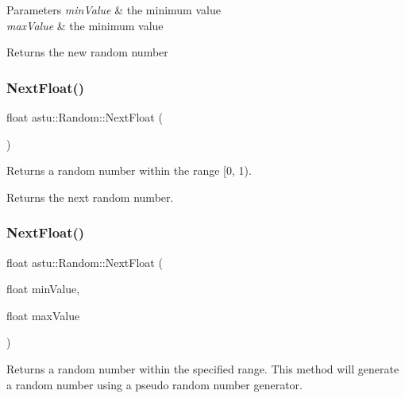 \begin{DoxyParams}{Parameters}
{\em min\+Value} & the minimum value \\
\hline
{\em max\+Value} & the minimum value \\
\hline
\end{DoxyParams}
\begin{DoxyReturn}{Returns}
the new random number 
\end{DoxyReturn}
\mbox{\label{classastu_1_1Random_aac568f26a878a1dc7facc767c0977713}} 
\subsubsection{\texorpdfstring{Next\+Float()}{NextFloat()}\hspace{0.1cm}{\footnotesize\ttfamily [1/2]}}
{\footnotesize\ttfamily float astu\+::\+Random\+::\+Next\+Float (\begin{DoxyParamCaption}{ }\end{DoxyParamCaption})}

Returns a random number within the range \mbox{[}0, 1).

\begin{DoxyReturn}{Returns}
the next random number. 
\end{DoxyReturn}
\mbox{\label{classastu_1_1Random_aedc793a4f422aed4ac49c8e3cde9d3b9}} 
\subsubsection{\texorpdfstring{Next\+Float()}{NextFloat()}\hspace{0.1cm}{\footnotesize\ttfamily [2/2]}}
{\footnotesize\ttfamily float astu\+::\+Random\+::\+Next\+Float (\begin{DoxyParamCaption}\item[{float}]{min\+Value,  }\item[{float}]{max\+Value }\end{DoxyParamCaption})}

Returns a random number within the specified range. This method will generate a random number using a pseudo random number generator.

